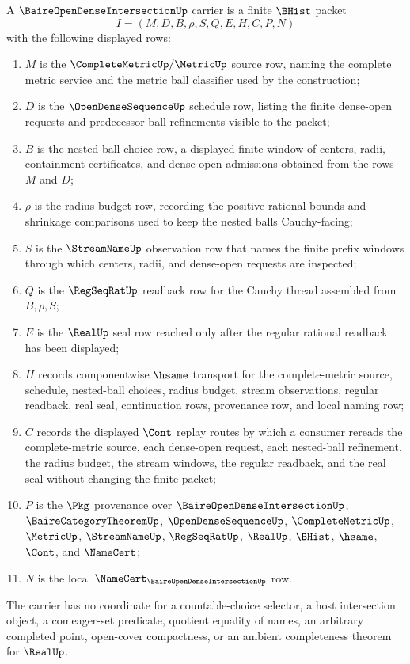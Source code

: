 \begin{definition}
\label{def:baire-open-dense-intersection-carrier}
A $\BaireOpenDenseIntersectionUp$ carrier is a finite $\BHist$ packet
$$
I=(M,D,B,\rho,S,Q,E,H,C,P,N)
$$
with the following displayed rows:
\begin{enumerate}
\item $M$ is the $\CompleteMetricUp/\MetricUp$ source row, naming the complete metric service and the metric ball classifier used by the construction;
\item $D$ is the $\OpenDenseSequenceUp$ schedule row, listing the finite dense-open requests and predecessor-ball refinements visible to the packet;
\item $B$ is the nested-ball choice row, a displayed finite window of centers, radii, containment certificates, and dense-open admissions obtained from the rows $M$ and $D$;
\item $\rho$ is the radius-budget row, recording the positive rational bounds and shrinkage comparisons used to keep the nested balls Cauchy-facing;
\item $S$ is the $\StreamNameUp$ observation row that names the finite prefix windows through which centers, radii, and dense-open requests are inspected;
\item $Q$ is the $\RegSeqRatUp$ readback row for the Cauchy thread assembled from $B,\rho,S$;
\item $E$ is the $\RealUp$ seal row reached only after the regular rational readback has been displayed;
\item $H$ records componentwise $\hsame$ transport for the complete-metric source, schedule, nested-ball choices, radius budget, stream observations, regular readback, real seal, continuation rows, provenance row, and local naming row;
\item $C$ records the displayed $\Cont$ replay routes by which a consumer rereads the complete-metric source, each dense-open request, each nested-ball refinement, the radius budget, the stream windows, the regular readback, and the real seal without changing the finite packet;
\item $P$ is the $\Pkg$ provenance over $\BaireOpenDenseIntersectionUp$, $\BaireCategoryTheoremUp$, $\OpenDenseSequenceUp$, $\CompleteMetricUp$, $\MetricUp$, $\StreamNameUp$, $\RegSeqRatUp$, $\RealUp$, $\BHist$, $\hsame$, $\Cont$, and $\NameCert$;
\item $N$ is the local $\NameCert_{\BaireOpenDenseIntersectionUp}$ row.
\end{enumerate}
The carrier has no coordinate for a countable-choice selector, a host intersection object, a comeager-set predicate, quotient equality of names, an arbitrary completed point, open-cover compactness, or an ambient completeness theorem for $\RealUp$.
\end{definition}

